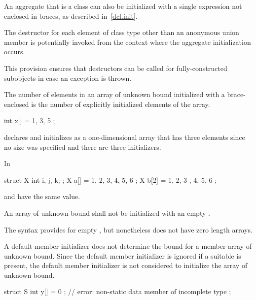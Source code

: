 \pnum
An aggregate that is a class can also be initialized with a single
expression not enclosed in braces, as described in~\ref{dcl.init}.

\pnum
The destructor for each element of class type
other than an anonymous union member
is potentially invoked
from the context where the aggregate initialization occurs.
\begin{note}
This provision ensures that destructors can be called
for fully-constructed subobjects
in case an exception is thrown.
\end{note}

\pnum
The number of elements in an array of unknown bound
initialized with a brace-enclosed 
is the number of explicitly initialized elements of the array.
\begin{example}
\begin{codeblock}
int x[] = { 1, 3, 5 };
\end{codeblock}
declares and initializes
as a one-dimensional array that has three elements
since no size was specified and there are three initializers.
\end{example}
\begin{example}
In
\begin{codeblock}
struct X { int i, j, k; };
X a[] = { 1, 2, 3, 4, 5, 6 };
X b[2] = { { 1, 2, 3 }, { 4, 5, 6 } };
\end{codeblock}
 and  have the same value.
\end{example}
An array of unknown bound shall not be initialized with
an empty  \tcode{\{\}}.
\begin{footnote}
The syntax provides for empty ,
but nonetheless \Cpp{} does not have zero length arrays.
\end{footnote}
\begin{note}
A default member initializer does not determine the bound for a member
array of unknown bound.  Since the default member initializer is
ignored if a suitable  is present,
the default member initializer is not
considered to initialize the array of unknown bound.
\begin{example}
\begin{codeblock}
struct S {
  int y[] = { 0 };          // error: non-static data member of incomplete type
};
\end{codeblock}
\end{example}
\end{note}

